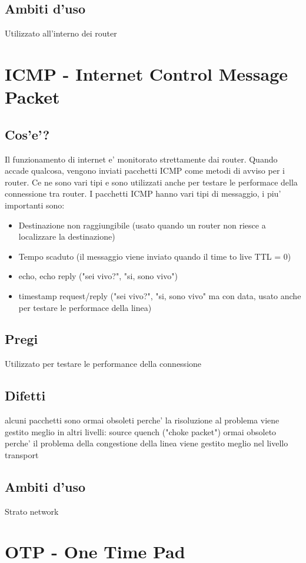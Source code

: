 \subsection{Ambiti d'uso}
Utilizzato all'interno dei router
\section{ICMP - Internet Control Message Packet}
\subsection{Cos'e'?}
Il funzionamento di internet e' monitorato strettamente dai router. Quando accade qualcosa, vengono inviati pacchetti ICMP come metodi di avviso per i router. Ce ne sono vari tipi e sono utilizzati anche per testare le performace della connessione tra router. I pacchetti ICMP hanno vari tipi di messaggio, i piu' importanti sono:
\begin{itemize}
	\item Destinazione non raggiungibile (usato quando un router non riesce a localizzare la destinazione)
	\item Tempo scaduto (il messaggio viene inviato quando il time to live TTL = 0)
	\item echo, echo reply ("sei vivo?", "si, sono vivo")
	\item timestamp request/reply ("sei vivo?", "si, sono vivo" ma con data, usato anche per testare le performace della linea)
\end{itemize}
\subsection{Pregi}
Utilizzato per testare le performance della connessione
\subsection{Difetti}
alcuni pacchetti sono ormai obsoleti perche' la risoluzione al problema viene gestito meglio in altri livelli: source quench ("choke packet") ormai obsoleto perche' il problema della congestione della linea viene gestito meglio nel livello transport
\subsection{Ambiti d'uso}
Strato network
\section{OTP - One Time Pad}
